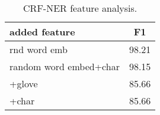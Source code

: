 \documentclass[11pt]{article}
\begin{document}
\begin{table}
\begin{center}
\begin{tabular}{l|c}
\hline 
added feature & F1 \\ 
\hline 
rnd word emb & 98.21 \\
random word embed+char   & 98.15 \\
+glove     & 85.66 \\
+char     & 85.66 \\


\end{tabular} 
\caption{CRF-NER feature analysis.}
\end{center}
\label{perf}
\end{table}




\end{document}
